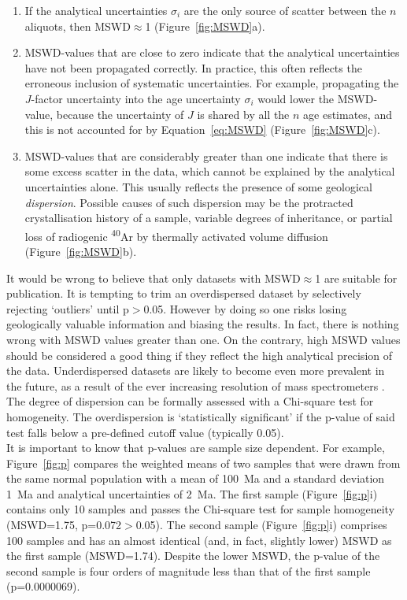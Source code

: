 \documentclass{article}
\begin{document}
\begin{enumerate}
\item If the analytical uncertainties $\sigma_i$ are the only source
  of scatter between the $n$ aliquots, then MSWD$\approx$1
  (Figure~\ref{fig:MSWD}a).

\item MSWD-values that are close to zero indicate that the analytical
  uncertainties have not been propagated correctly. In practice, this
  often reflects the erroneous inclusion of systematic
  uncertainties. For example, propagating the $J$-factor uncertainty
  into the age uncertainty $\sigma_i$ would lower the MSWD-value,
  because the uncertainty of $J$ is shared by all the $n$ age
  estimates, and this is not accounted for by Equation~\ref{eq:MSWD}
  (Figure~\ref{fig:MSWD}c).
  
\item MSWD-values that are considerably greater than one indicate that
  there is some excess scatter in the data, which cannot be explained
  by the analytical uncertainties alone. This usually reflects the
  presence of some geological \emph{dispersion}. Possible causes of
  such dispersion may be the protracted crystallisation history of a
  sample, variable degrees of inheritance, or partial loss of
  radiogenic \textsuperscript{40}Ar by thermally activated volume
  diffusion (Figure~\ref{fig:MSWD}b).
\end{enumerate}

It would be wrong to believe that only datasets with MSWD$\approx$1
are suitable for publication.  It is tempting to trim an overdispersed
dataset by selectively rejecting `outliers' until p$>$0.05. However by
doing so one risks losing geologically valuable information and
biasing the results.  In fact, there is nothing wrong with MSWD values
greater than one.  On the contrary, high MSWD values should be
considered a good thing if they reflect the high analytical precision
of the data.  Underdispersed datasets are likely to become even more
prevalent in the future, as a result of the ever increasing resolution
of mass spectrometers \citep{phillips2013}. The degree of dispersion
can be formally assessed with a Chi-square test for homogeneity. The
overdispersion is `statistically significant' if the p-value of said
test falls below a pre-defined cutoff value (typically 0.05).\\

It is important to know that p-values are sample size dependent. For
example, Figure~\ref{fig:p} compares the weighted means of two samples
that were drawn from the same normal population with a mean of 100~Ma
and a standard deviation 1~Ma and analytical uncertainties of 2~Ma.
The first sample (Figure~\ref{fig:p}i) contains only 10 samples and
passes the Chi-square test for sample homogeneity (MSWD=1.75,
p=0.072$>$0.05).  The second sample (Figure~\ref{fig:p}i) comprises
100 samples and has an almost identical (and, in fact, slightly lower)
MSWD as the first sample (MSWD=1.74). Despite the lower MSWD, the
p-value of the second sample is four orders of magnitude less than
that of the first sample (p=0.0000069).\\
\end{document}
